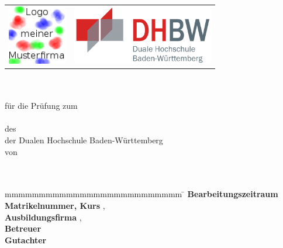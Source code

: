 \begin{titlepage}
	\begin{longtable}{p{} p{}}
	  {\includegraphics[height=2.6cm]{images/logo.png}} & 
	  {\includegraphics[height=2.6cm]{images/dhbw.png}}
	\end{longtable}
	\enlargethispage{20mm}
	\begin{center}
	  \vspace*{12mm}	{\LARGE\bf \titel }\\
	  \vspace*{12mm}	{\large\bf \arbeit}\\
	  \vspace*{12mm}	für die Prüfung zum\\
	  \vspace*{3mm} 	{\bf \abschluss}\\
	  \vspace*{12mm}	des \studiengang\\
	  \vspace*{3mm} 	der Dualen Hochschule Baden-Württemberg \dhbw\\
	  \vspace*{12mm}	von\\
	  \vspace*{3mm} 	{\large\bf \autor}\\
	  \vspace*{12mm}	\datumAbgabe\\
	\end{center}
	\vfill
	\begin{spacing}{1.2}
	\begin{tabbing}
		mmmmmmmmmmmmmmmmmmmmmmmmmm     \= \kill
		\textbf{Bearbeitungszeitraum}  \>  \zeitraum\\
		\textbf{Matrikelnummer, Kurs}  \>  \martrikelnr, \kurs\\
		\textbf{Ausbildungsfirma}      \>  \firma, \firmenort\\
		\textbf{Betreuer}              \>  \betreuer\\
		\textbf{Gutachter}             \>  \gutachter
	\end{tabbing}
	\end{spacing}
\end{titlepage}
